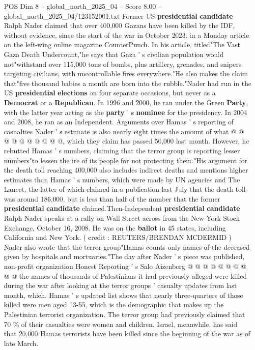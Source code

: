 \begin{textsample}{POS Dim 8 – global\_north\_2025\_04 – Score 8.00 – global\_north\_2025\_04/123152001.txt}  \label{ex:f8_pos_372}
Former US \textbf{presidential} \textbf{candidate} Ralph Nader claimed that over 400,000 Gazans have been killed by the IDF, without evidence, since the start of the war in October 2023, in a Monday article on the left-wing online magazine CounterPunch.
In his article, titled"The Vast Gaza Death Undercount,"he says that Gaza ' s civilian population would not"withstand over 115,000 tons of bombs, plus artillery, grenades, and snipers targeting civilians, with uncontrollable fires everywhere."He also makes the claim that"five thousand babies a month are born into the rubble."Nader had run in the US \textbf{presidential} \textbf{elections} on four separate occasions, but never as a \textbf{Democrat} or a \textbf{Republican}.
In 1996 and 2000, he ran under the Green \textbf{Party}, with the latter year acting as the \textbf{party} ' s \textbf{nominee} for the presidency.
In 2004 and 2008, he ran as an Independent.
Arguments over Hamas ' s reporting of casualties Nader ' s estimate is also nearly eight times the amount of what @ @ @ @ @ @ @ @ @ @, which they claim has passed 50,000 last month.
However, he rebutted Hamas ' s numbers, claiming that the terror group is reporting lesser numbers"to lessen the ire of its people for not protecting them."His argument for the death toll reaching 400,000 also includes indirect deaths and mentions higher estimates than Hamas ' s numbers, which were made by UN agencies and The Lancet, the latter of which claimed in a publication last July that the death toll was around 186,000, but is less than half of the number that the former \textbf{presidential} \textbf{candidate} claimed.Then-Independent \textbf{presidential} \textbf{candidate} Ralph Nader speaks at a rally on Wall Street across from the New York Stock Exchange, October 16, 2008.
He was on the \textbf{ballot} in 45 states, including California and New York. ( credit : REUTERS/BRENDAN MCDERMID ) Nader also wrote that the terror group"Hamas counts only names of the deceased given by hospitals and mortuaries."The day after Nader ' s piece was published, non-profit organization Honest Reporting ' s Salo Aizenberg @ @ @ @ @ @ @ @ @ @ the names of thousands of Palestinians it had previously alleged were killed during the war after looking at the terror groups ' casualty updates from last month, which.
Hamas ' s updated list shows that nearly three-quarters of those killed were men aged 13-55, which is the demographic that makes up the Palestinian terrorist organization.
The terror group had previously claimed that 70 \% of their casualties were women and children.
Israel, meanwhile, has said that 20,000 Hamas terrorists have been killed since the beginning of the war as of late March.

\end{textsample}
